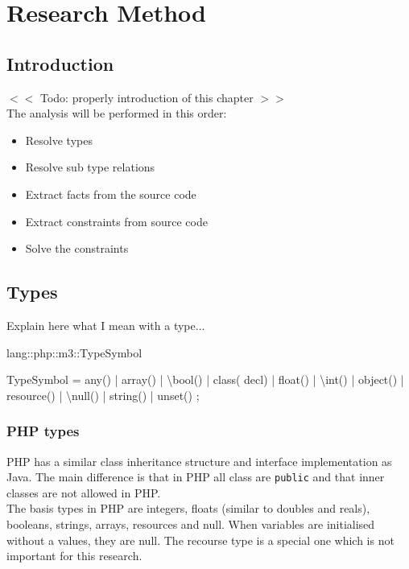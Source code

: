 \documentclass[../main.tex]{subfiles}
\begin{document}
    \chapter{Research Method}\label{chap:research_method}


    \section{Introduction}
    $<<$ Todo: properly introduction of this chapter $>>$
    \\
    The analysis will be performed in this order:
    \begin{itemize}
        \item Resolve types
        \item Resolve sub type relations
        \item Extract facts from the source code
        \item Extract constraints from source code
        \item Solve the constraints
    \end{itemize}

    \section{Types}
    Explain here what I mean with a type...
    
    \begin{rascal}
 lang::php::m3::TypeSymbol

 TypeSymbol
  = any()
  | array()
  | \textbackslash{}bool()
  | class( decl)
  | float()
  | \textbackslash{}int()
  | object()
  | resource()
  | \textbackslash{}null()
  | string()
  | unset()
  ; 
    \end{rascal}
    
    \subsection{PHP types}
    PHP has a similar class inheritance structure and interface implementation as Java.
    The main difference is that in PHP all class are \texttt{public} and that inner classes are not allowed in PHP. 
    \\
    The basis types in PHP are integers, floats (similar to doubles and reals), booleans, strings, arrays, resources and null.
    When variables are initialised without a values, they are null. The recourse type is a special one which is not important for this research.
 
\end{document}
